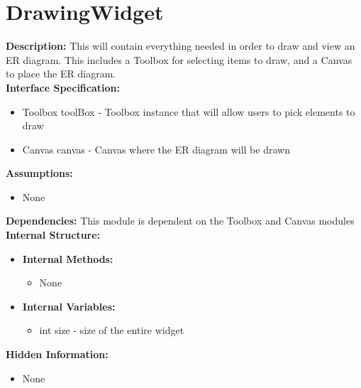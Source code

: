 \chapter{DrawingWidget}
\textbf{Description:} This will contain everything needed in order to draw and view an ER diagram. This includes a Toolbox for selecting items to draw, and a Canvas to place the ER diagram. \\
\textbf{Interface Specification:}
\begin{itemize}
\item{Toolbox toolBox - Toolbox instance that will allow users to pick elements to draw}
\item{Canvas canvas - Canvas where the ER diagram will be drawn}
\end{itemize}
\textbf{Assumptions:}
\begin{itemize}
\item {None}
\end{itemize}
\textbf{Dependencies:} This module is dependent on the Toolbox and Canvas modules \\
\textbf{Internal Structure:}
\begin{itemize}
        	\item{\textbf{Internal Methods:} 
        	\begin{itemize}
        	\item{None}
        	\end{itemize}}
        	\item{\textbf{Internal Variables:} 
        	\begin{itemize}
        	\item{int size - size of the entire widget}
        	\end{itemize}}
\end{itemize}
\textbf{Hidden Information:}
\begin{itemize}
\item{None} 
\end{itemize}

